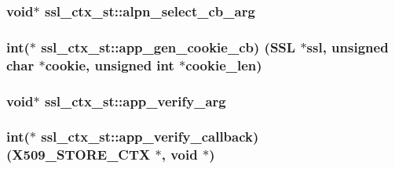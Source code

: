 \subsubsection[{\texorpdfstring{alpn\+\_\+select\+\_\+cb\+\_\+arg}{alpn_select_cb_arg}}]{\setlength{\rightskip}{0pt plus 5cm}void$\ast$ ssl\+\_\+ctx\+\_\+st\+::alpn\+\_\+select\+\_\+cb\+\_\+arg}\hypertarget{structssl__ctx__st_aae35dbc7321a52ce8aff7b5b6b0a23eb}{}\label{structssl__ctx__st_aae35dbc7321a52ce8aff7b5b6b0a23eb}
\subsubsection[{\texorpdfstring{app\+\_\+gen\+\_\+cookie\+\_\+cb}{app_gen_cookie_cb}}]{\setlength{\rightskip}{0pt plus 5cm}int($\ast$ ssl\+\_\+ctx\+\_\+st\+::app\+\_\+gen\+\_\+cookie\+\_\+cb) ({\bf S\+SL} $\ast$ssl, unsigned char $\ast$cookie, unsigned int $\ast$cookie\+\_\+len)}\hypertarget{structssl__ctx__st_ab2351134c9d3a5f42c85d731edfa4c1b}{}\label{structssl__ctx__st_ab2351134c9d3a5f42c85d731edfa4c1b}
\subsubsection[{\texorpdfstring{app\+\_\+verify\+\_\+arg}{app_verify_arg}}]{\setlength{\rightskip}{0pt plus 5cm}void$\ast$ ssl\+\_\+ctx\+\_\+st\+::app\+\_\+verify\+\_\+arg}\hypertarget{structssl__ctx__st_ac65736129c311f93009b7f3d67b95bcf}{}\label{structssl__ctx__st_ac65736129c311f93009b7f3d67b95bcf}
\subsubsection[{\texorpdfstring{app\+\_\+verify\+\_\+callback}{app_verify_callback}}]{\setlength{\rightskip}{0pt plus 5cm}int($\ast$ ssl\+\_\+ctx\+\_\+st\+::app\+\_\+verify\+\_\+callback) ({\bf X509\+\_\+\+S\+T\+O\+R\+E\+\_\+\+C\+TX} $\ast$, void $\ast$)}\hypertarget{structssl__ctx__st_a15acd6b0d3d6e8307c6c67e7d46c9e96}{}\label{structssl__ctx__st_a15acd6b0d3d6e8307c6c67e7d46c9e96}
